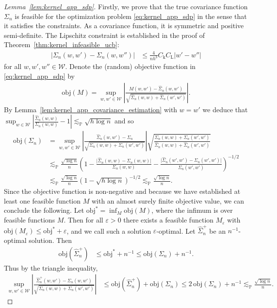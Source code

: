 \documentclass[11pt,lof]{puthesis}
\renewcommand{\P}{\ensuremath{\mathbb{P}}}
\newcommand{\rL}{\ensuremath{\mathrm{L}}}
\newcommand{\rk}{\ensuremath{\mathrm{k}}}
\newcommand{\cW}{\ensuremath{\mathcal{W}}}
\newcommand{\objective}{\ensuremath{\mathrm{obj}}}
\theoremstyle{break}
\theoremstyle{proof}
\newtheorem{proof}{Proof}
\begin{document}
\begin{proof}[Lemma~\ref{lem:kernel_app_sdp}]

Firstly, we prove that the true covariance function
$\Sigma_n$
is feasible for the optimization problem
\eqref{eq:kernel_app_sdp} in the sense that it satisfies the constraints.
As a covariance function, it is symmetric and positive semi-definite.
The Lipschitz constraint is established in the proof of
Theorem~\ref{thm:kernel_infeasible_ucb}:
%
\begin{align*}
\big| \Sigma_n(w,w') - \Sigma_n(w, w'') \big|
&\leq
\frac{4}{n h^3}
C_\rk
C_\rL
|w'-w''|
\end{align*}
%
for all $w,w',w'' \in \cW$.
Denote the (random) objective function
in \eqref{eq:kernel_app_sdp} by
%
\begin{align*}
\objective(M) = \sup_{w,w' \in \cW}
\left|
\frac{M(w,w') - \hat\Sigma_n(w,w')}
{\sqrt{\hat \Sigma_n(w,w) + \hat \Sigma_n(w',w')}}
\right|.
\end{align*}
%
By Lemma~\ref{lem:kernel_app_covariance_estimation}
with $w = w'$ we deduce that
$\sup_{w \in \cW}
\left|\frac{\hat \Sigma_n(w,w)}{\Sigma_n(w,w)} - 1\right|
\lesssim_\P \sqrt{h \log n}$
and so
%
\begin{align*}
\objective(\Sigma_n)
&= \sup_{w,w' \in \cW}
\left|
\frac{\hat\Sigma_n(w,w') - \Sigma_n}
{\sqrt{\Sigma_n(w,w) + \Sigma_n(w',w')}}
\right|
\sqrt{\frac{\Sigma_n(w,w) + \Sigma_n(w',w')}
{\hat \Sigma_n(w,w) + \hat \Sigma_n(w',w')}} \\
&\lesssim_\P
\frac{\sqrt{\log n}}{n}
\left(
1 - \frac{\big|\hat \Sigma_n(w,w) - \Sigma_n(w,w)\big|}
{\Sigma_n(w,w)}
- \frac{\big|\hat \Sigma_n(w',w') - \Sigma_n(w',w')\big|}
{\Sigma_n(w',w')}
\right)^{-1/2} \\
&\lesssim_\P
\frac{\sqrt{\log n}}{n}
\left(
1 - \sqrt{h \log n}
\right)^{-1/2}
\lesssim_\P
\frac{\sqrt{\log n}}{n}.
\end{align*}
%
Since the objective function
is non-negative and because we have established
at least one feasible function $M$ with
an almost surely finite objective value,
we can conclude the following.
Let $\objective^* = \inf_M \objective(M)$,
where the infimum is over feasible functions $M$.
Then for all $\varepsilon > 0$
there exists a feasible function $M_\varepsilon$ with
$\objective(M_\varepsilon) \leq \objective^* + \varepsilon$,
and we call such a solution $\varepsilon$-optimal.
Let $\hat \Sigma_n^+$ be an $n^{-1}$-optimal solution.
Then
%
\begin{align*}
\objective(\hat \Sigma_n^+)
&\leq \objective^* + n^{-1}
\leq \objective(\Sigma_n) + n^{-1}.
\end{align*}
%
Thus by the triangle inequality,
%
\begin{align*}
\sup_{w,w' \in \cW}
\left|
\frac{\hat \Sigma_n^+(w,w') - \Sigma_n(w,w')}
{\sqrt{\Sigma_n(w,w) + \Sigma_n(w',w')}}
\right|
&\leq
\objective(\hat \Sigma_n^+)
+ \objective(\Sigma_n)
\leq 2 \, \objective(\Sigma_n) + n^{-1}
\lesssim_\P
\frac{\sqrt{\log n}}{n}.
\end{align*}
\end{proof}
\end{document}
